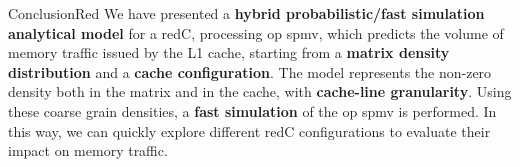 \begin{highlight}{Conclusion}{Red}
    We have presented a \textbf{hybrid probabilistic/fast simulation analytical model} for a \gls{redC}, processing \acrshort{op} \acrshort{spmv}, which predicts the volume of memory traffic issued by the L1 cache, starting from a \textbf{matrix density distribution} and a \textbf{cache configuration}.
    The model represents the non-zero density both in the matrix and in the cache, with \textbf{cache-line granularity}.
    Using these coarse grain densities, a \textbf{fast simulation} of the \acrshort{op} \acrshort{spmv} is performed.
    In this way, we can quickly explore different \gls{redC} configurations to evaluate their impact on memory traffic.
\end{highlight}
